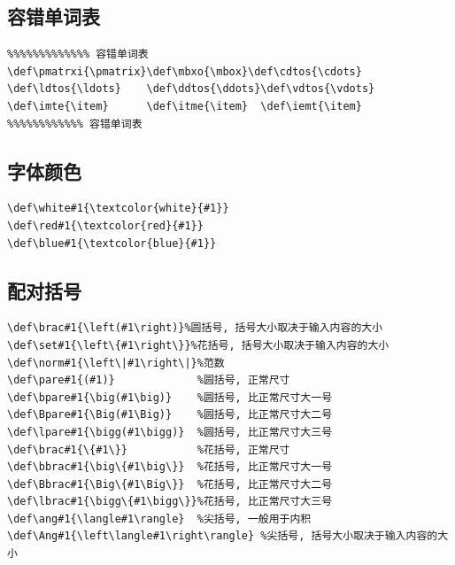 \documentclass[a4paper,12pt,twoside]{ctexart}
\begin{document}
    \vspace*{-20pt}\noindent
    \subsection{容错单词表}
\begin{verbatim}
%%%%%%%%%%%%% 容错单词表
\def\pmatrxi{\pmatrix}\def\mbxo{\mbox}\def\cdtos{\cdots}
\def\ldtos{\ldots}    \def\ddtos{\ddots}\def\vdtos{\vdots}
\def\imte{\item}      \def\itme{\item}  \def\iemt{\item}
%%%%%%%%%%%% 容错单词表
\end{verbatim}\vspace{-00pt}


\vspace{-20pt}
    \subsection{字体颜色}
\begin{verbatim}
\def\white#1{\textcolor{white}{#1}}
\def\red#1{\textcolor{red}{#1}}
\def\blue#1{\textcolor{blue}{#1}}
\end{verbatim}\vspace{-0pt}

\vspace{-20pt}
    \subsection{配对括号}
\begin{verbatim}
\def\brac#1{\left(#1\right)}%圆括号, 括号大小取决于输入内容的大小
\def\set#1{\left\{#1\right\}}%花括号, 括号大小取决于输入内容的大小
\def\norm#1{\left\|#1\right\|}%范数
\def\pare#1{(#1)}             %圆括号, 正常尺寸
\def\bpare#1{\big(#1\big)}    %圆括号, 比正常尺寸大一号
\def\Bpare#1{\Big(#1\Big)}    %圆括号, 比正常尺寸大二号
\def\lpare#1{\bigg(#1\bigg)}  %圆括号, 比正常尺寸大三号
\def\brac#1{\{#1\}}           %花括号, 正常尺寸
\def\bbrac#1{\big\{#1\big\}}  %花括号, 比正常尺寸大一号
\def\Bbrac#1{\Big\{#1\Big\}}  %花括号, 比正常尺寸大二号
\def\lbrac#1{\bigg\{#1\bigg\}}%花括号, 比正常尺寸大三号
\def\ang#1{\langle#1\rangle}  %尖括号, 一般用于内积
\def\Ang#1{\left\langle#1\right\rangle} %尖括号, 括号大小取决于输入内容的大小
\end{verbatim}\vspace{-0pt}

\vspace{-20pt}
\end{document}
